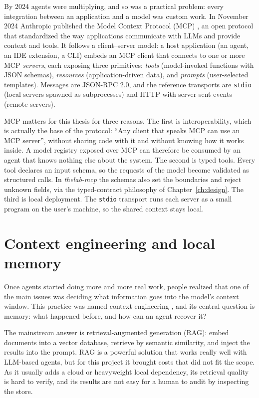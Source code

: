 By 2024 agents were multiplying, and so was a practical problem: every integration between an application and a model was custom work. In November 2024 Anthropic published the Model Context Protocol (MCP) \cite{mcp2024spec,mcp2024announce}, an open protocol that standardized the way applications communicate with LLMs and provide context and tools. It follows a client--server model: a host application (an agent, an IDE extension, a CLI) embeds an MCP client that connects to one or more MCP \emph{servers}, each exposing three primitives: \emph{tools} (model-invoked functions with JSON schemas), \emph{resources} (application-driven data), and \emph{prompts} (user-selected templates). Messages are JSON-RPC 2.0, and the reference transports are \texttt{stdio} (local servers spawned as subprocesses) and HTTP with server-sent events (remote servers).

MCP matters for this thesis for three reasons. The first is interoperability, which is actually the base of the protocol: ``Any client that speaks MCP can use an MCP server'', without sharing code with it and without knowing how it works inside. A model registry exposed over MCP can therefore be consumed by an agent that knows nothing else about the system. The second is typed tools. Every tool declares an input schema, so the requests of the model become validated as structured calls. In \emph{thelab-mcp} the schemas also set the boundaries and reject unknown fields, via the typed-contract philosophy of Chapter~\ref{ch:design}. The third is local deployment. The \texttt{stdio} transport runs each server as a small program on the user's machine, so the shared context stays local.


\section{Context engineering and local memory}
\label{sec:bg-context}

Once agents started doing more and more real work, people realized that one of the main issues was deciding what information goes into the model's context window. This practice
was named context engineering \cite{horthy2025twelvefactor,bonigarcia2025context}, and its central question is memory: what happened before, and how can an agent recover it?

The mainstream answer is retrieval-augmented generation (RAG): embed documents into a vector database, retrieve by semantic similarity, and inject the results into the prompt. RAG is a powerful solution that works really well with LLM-based agents, but for this project it brought costs that did not fit the scope. As it usually adds a cloud or heavyweight local dependency, its retrieval quality is hard to verify, and its results are not easy for a human to audit by inspecting the store.

